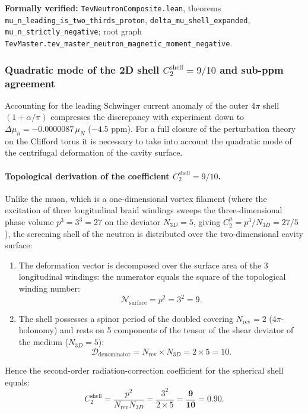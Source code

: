 \documentclass[11pt,a4paper]{article}
\theoremstyle{definition}
\theoremstyle{remark}
\begin{document}
\noindent\small\textbf{Formally verified:} \texttt{TevNeutronComposite.lean}, theorems \texttt{mu\_n\_leading\_is\_two\_thirds\_proton}, \texttt{delta\_mu\_shell\_expanded}, \texttt{mu\_n\_strictly\_negative}; root graph \texttt{TevMaster.tev\_master\_neutron\_magnetic\_moment\_negative}.

\subsubsection{Quadratic mode of the 2D shell $C_2^{\mathrm{shell}} = 9/10$ and sub-ppm agreement}
\label{subsubsec:neutron_order2_precision}

Accounting for the leading Schwinger current anomaly of the outer $4\pi$ shell $(1 + \alpha/\pi)$ compresses the discrepancy with experiment down to $\Delta \mu_n = -0.0000087\,\mu_N$ ($-4.5\text{ ppm}$). For a full closure of the perturbation theory on the Clifford torus it is necessary to take into account the quadratic mode of the centrifugal deformation of the cavity surface.

\paragraph{Topological derivation of the coefficient $C_2^{\mathrm{shell}} = 9/10$.}
Unlike the muon, which is a one-dimensional vortex filament (where the excitation of three longitudinal braid windings sweeps the three-dimensional phase volume $p^3 = 3^3 = 27$ on the deviator $N_{3D} = 5$, giving $C_2^\mu = p^3/N_{3D} = 27/5$), the screening shell of the neutron is distributed over the two-dimensional cavity surface:
\begin{enumerate}
    \item The deformation vector is decomposed over the surface area of the 3 longitudinal windings: the numerator equals the square of the topological winding number:
    \begin{equation}
    \mathcal{N}_{\mathrm{surface}} = p^2 = 3^2 = 9.
    \end{equation}
    \item The shell possesses a spinor period of the doubled covering $N_{\mathrm{rev}} = 2$ ($4\pi$-holonomy) and rests on 5 components of the tensor of the shear deviator of the medium ($N_{3D} = 5$):
    \begin{equation}
    \mathcal{D}_{\mathrm{denominator}} = N_{\mathrm{rev}} \times N_{3D} = 2 \times 5 = 10.
    \end{equation}
\end{enumerate}
Hence the second-order radiation-correction coefficient for the spherical shell equals:
\begin{equation}
C_2^{\mathrm{shell}} = \frac{p^2}{N_{\mathrm{rev}} N_{3D}} = \frac{3^2}{2 \times 5} = \mathbf{\frac{9}{10} = 0.90}.
\end{equation}
\end{document}
